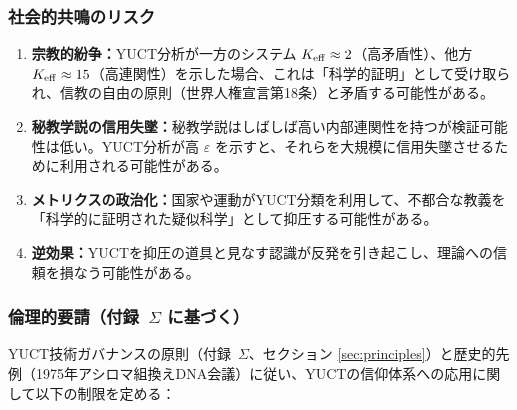 \documentclass[11pt,a4paper]{article}
\newcommand{\eps}{\varepsilon}
\begin{document}
	\subsubsection{社会的共鳴のリスク}
	
	\begin{enumerate}
		\item \textbf{宗教的紛争：}YUCT分析が一方のシステム $\Keff \approx 2$（高矛盾性）、他方 $\Keff \approx 15$（高連関性）を示した場合、これは「科学的証明」として受け取られ、信教の自由の原則（世界人権宣言第18条）と矛盾する可能性がある。
		
		\item \textbf{秘教学説の信用失墜：}秘教学説はしばしば高い内部連関性を持つが検証可能性は低い。YUCT分析が高 $\eps$ を示すと、それらを大規模に信用失墜させるために利用される可能性がある。
		
		\item \textbf{メトリクスの政治化：}国家や運動がYUCT分類を利用して、不都合な教義を「科学的に証明された疑似科学」として抑圧する可能性がある。
		
		\item \textbf{逆効果：}YUCTを抑圧の道具と見なす認識が反発を引き起こし、理論への信頼を損なう可能性がある。
	\end{enumerate}
	
	\subsubsection{倫理的要請（付録~$\Sigma$ に基づく）}
	
	YUCT技術ガバナンスの原則（付録~$\Sigma$、セクション \ref{sec:principles}）と歴史的先例（1975年アシロマ組換えDNA会議）に従い、YUCTの信仰体系への応用に関して以下の制限を定める：
	
\end{document}
